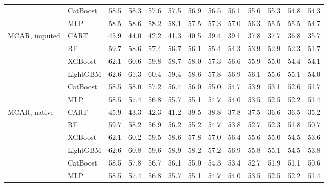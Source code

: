 \begin{table}[p]
\begin{tabular}{@{}llrrrrrrrrrrr@{}}
 & CatBoost & 58.5 & 58.3 & 57.6 & 57.5 & 56.9 & 56.5 & 56.1 & 55.6 & 55.3 & 54.8 & 54.3 \\
 & MLP & 58.5 & 58.6 & 58.2 & 58.1 & 57.5 & 57.3 & 57.0 & 56.3 & 55.5 & 55.5 & 54.7 \\
\midrule
MCAR, imputed & CART & 45.9 & 44.0 & 42.2 & 41.3 & 40.5 & 39.4 & 39.1 & 37.8 & 37.7 & 36.8 & 35.7 \\
 & RF & 59.7 & 58.6 & 57.4 & 56.7 & 56.1 & 55.4 & 54.3 & 53.9 & 52.9 & 52.3 & 51.7 \\
 & XGBoost & 62.1 & 60.6 & 59.8 & 58.7 & 58.0 & 57.3 & 56.6 & 55.9 & 55.0 & 54.4 & 54.1 \\
 & LightGBM & 62.6 & 61.3 & 60.4 & 59.4 & 58.6 & 57.8 & 56.9 & 56.1 & 55.6 & 55.1 & 54.0 \\
 & CatBoost & 58.5 & 58.0 & 57.2 & 56.4 & 56.0 & 55.0 & 54.7 & 53.9 & 53.1 & 52.6 & 51.7 \\
 & MLP & 58.5 & 57.4 & 56.8 & 55.7 & 55.1 & 54.7 & 54.0 & 53.5 & 52.5 & 52.2 & 51.4 \\
\midrule
MCAR, native & CART & 45.9 & 43.3 & 42.3 & 41.2 & 39.5 & 38.8 & 37.8 & 37.5 & 36.6 & 36.5 & 35.2 \\
 & RF & 59.7 & 58.2 & 56.9 & 56.2 & 55.2 & 54.7 & 53.8 & 52.7 & 52.3 & 51.8 & 50.7 \\
 & XGBoost & 62.1 & 60.2 & 59.5 & 58.6 & 57.8 & 57.0 & 56.4 & 55.6 & 55.0 & 54.5 & 53.6 \\
 & LightGBM & 62.6 & 60.8 & 59.6 & 58.9 & 58.2 & 57.2 & 56.9 & 55.8 & 55.1 & 54.5 & 53.8 \\
 & CatBoost & 58.5 & 57.8 & 56.7 & 56.1 & 55.0 & 54.3 & 53.4 & 52.7 & 51.9 & 51.1 & 50.6 \\
 & MLP & 58.5 & 57.4 & 56.8 & 55.7 & 55.1 & 54.7 & 54.0 & 53.5 & 52.5 & 52.2 & 51.4 \\
\bottomrule
\end{tabular}
\end{table}
